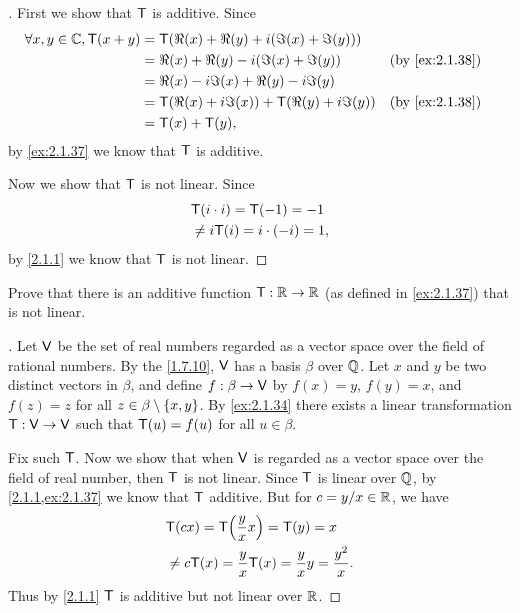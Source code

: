 \begin{proof}[]
  First we show that \(\mathsf{T}\) is additive.
  Since
  \begin{align*}
    \forall x, y \in \C, \T(x + y) & = \T(\Re(x) + \Re(y) + i (\Im(x) + \Im(y)))                                       \\
                                   & = \Re(x) + \Re(y) - i (\Im(x) + \Im(y))         &  & \text{(by \cref{ex:2.1.38})} \\
                                   & = \Re(x) - i \Im(x) + \Re(y) - i \Im(y)                                           \\
                                   & = \T(\Re(x) + i \Im(x)) + \T(\Re(y) + i \Im(y)) &  & \text{(by \cref{ex:2.1.38})} \\
                                   & = \T(x) + \T(y),
  \end{align*}
  by \cref{ex:2.1.37} we know that \(\mathsf{T}\) is additive.

  Now we show that \(\mathsf{T}\) is not linear.
  Since
  \begin{align*}
     & \mathsf{T}(i \cdot i) = \mathsf{T}(-1) = -1      \\
     & \neq i \mathsf{T}(i) = i \cdot (-i) = 1,
  \end{align*}
  by \cref{2.1.1} we know that \(\mathsf{T}\) is not linear.
\end{proof}

\begin{ex}\label{ex:2.1.39}
  Prove that there is an additive function \(\mathsf{T} : \mathbb{R} \to \mathbb{R}\) (as defined in \cref{ex:2.1.37}) that is not linear.
\end{ex}

\begin{proof}[]
  Let \(\mathsf{V}\) be the set of real numbers regarded as a vector space over the field of rational numbers.
  By the \cref{1.7.10}, \(\mathsf{V}\) has a basis \(\beta\) over \(\mathbb{Q}\).
  Let \(x\) and \(y\) be two distinct vectors in \(\beta\), and define \(f : \beta \to \mathsf{V}\) by \(f(x) = y\), \(f(y) = x\), and \(f(z) = z\) for all \(z \in \beta \setminus \left\lbrace x, y\right\rbrace\).
  By \cref{ex:2.1.34} there exists a linear transformation \(\mathsf{T} : \mathsf{V} \to \mathsf{V}\) such that \(\mathsf{T}(u) = f(u)\) for all \(u \in \beta\).

  Fix such \(\mathsf{T}\).
  Now we show that when \(\mathsf{V}\) is regarded as a vector space over the field of real number, then \(\mathsf{T}\) is not linear.
  Since \(\mathsf{T}\) is linear over \(\mathbb{Q}\), by \cref{2.1.1,ex:2.1.37} we know that \(\mathsf{T}\) additive.
  But for \(c = y / x \in \mathbb{R}\), we have
  \begin{align*}
     & \T(cx) = \T\pa{\frac{y}{x} x} = \T(y) = x                         \\
     & \neq c \T(x) = \frac{y}{x} \T(x) = \frac{y}{x} y = \frac{y^2}{x}.
  \end{align*}
  Thus by \cref{2.1.1} \(\mathsf{T}\) is additive but not linear over \(\mathbb{R}\).
\end{proof}

